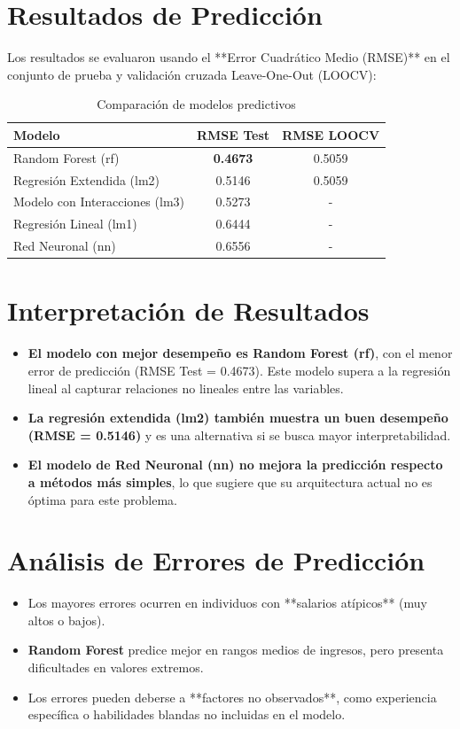 \documentclass[12pt,a4paper,onecolumn]{article}
\begin{document}
\section{Resultados de Predicción}

Los resultados se evaluaron usando el **Error Cuadrático Medio (RMSE)** en el conjunto de prueba y validación cruzada Leave-One-Out (LOOCV):

\begin{table}[H]
    \centering
    \caption{Comparación de modelos predictivos}
    \begin{tabular}{lcc}
        \toprule
        Modelo & RMSE Test & RMSE LOOCV \\
        \midrule
        Random Forest (rf) & \textbf{0.4673} & 0.5059 \\
        Regresión Extendida (lm2) & 0.5146 & 0.5059 \\
        Modelo con Interacciones (lm3) & 0.5273 & - \\
        Regresión Lineal (lm1) & 0.6444 & - \\
        Red Neuronal (nn) & 0.6556 & - \\
        \bottomrule
    \end{tabular}
    \label{tab:rmse_comparison}
\end{table}

\section{Interpretación de Resultados}
\begin{itemize}
    \item \textbf{El modelo con mejor desempeño es Random Forest (rf)}, con el menor error de predicción (RMSE Test = 0.4673). Este modelo supera a la regresión lineal al capturar relaciones no lineales entre las variables.
    \item \textbf{La regresión extendida (lm2) también muestra un buen desempeño (RMSE = 0.5146)} y es una alternativa si se busca mayor interpretabilidad.
    \item \textbf{El modelo de Red Neuronal (nn) no mejora la predicción respecto a métodos más simples}, lo que sugiere que su arquitectura actual no es óptima para este problema.
\end{itemize}

\section{Análisis de Errores de Predicción}
\begin{itemize}
    \item Los mayores errores ocurren en individuos con **salarios atípicos** (muy altos o bajos).
    \item \textbf{Random Forest} predice mejor en rangos medios de ingresos, pero presenta dificultades en valores extremos.
    \item Los errores pueden deberse a **factores no observados**, como experiencia específica o habilidades blandas no incluidas en el modelo.
\end{itemize}
\end{document}
